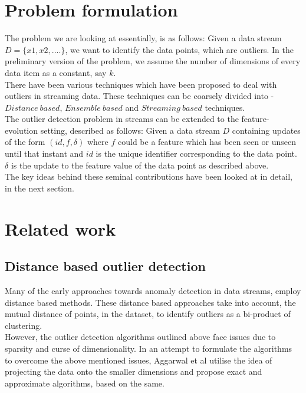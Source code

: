 \section{Problem formulation}

The problem we are looking at essentially, is as follows: Given a data stream $D = \{x1, x2, ....\}$, we want to identify the data points, which are outliers. In the preliminary version of the problem, we assume the number of dimensions of every data item as a constant, say $k$.\\

There have been various techniques\cite{tran2016distance}\cite{tan2011fast}\cite{aggarwal2013outlier} which have been proposed to deal with outliers in streaming data. These techniques can be coarsely divided into - $Distance\ based$, $Ensemble\ based$ and $Streaming\ based$ techniques. \\

The outlier detection problem in streams can be extended to the feature-evolution setting, described as follows: Given a data stream $D$ containing updates of the form $(id, f, \delta)$ where $f$ could be a feature which has been seen or unseen until that instant and $id$ is the unique identifier corresponding to the data point. $\delta$ is the update to the feature value of the data point as described above. \\

The key ideas behind these seminal contributions have been looked at in detail, in the next section.

\section{Related work}

\subsection{Distance based outlier detection}

Many of the early approaches towards anomaly detection in data streams, employ distance based methods. These distance based approaches take into account, the mutual distance of points, in the dataset, to identify outliers as a bi-product of clustering. \\

However, the outlier detection algorithms outlined above face issues due to sparsity and curse of dimensionality. In an attempt to formulate the algorithms to overcome the above mentioned issues, Aggarwal et al utilise the idea of projecting the data onto the smaller dimensions\cite{aggarwal2001outlier} and propose exact and approximate algorithms, based on the same. \\

